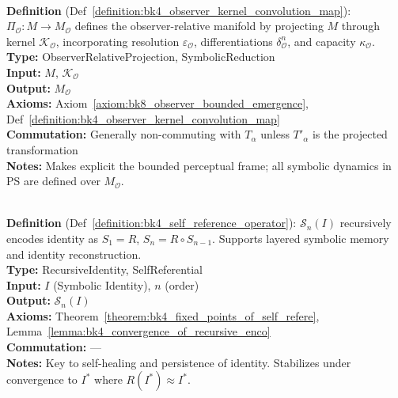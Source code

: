 \begin{description}[leftmargin=2.5cm, style=nextline]
\item[\textbf{Observer Kernel Projection} \hfill \ensuremath{\Pi_{\mathcal{O}}}] \leavevmode\\
\textbf{Definition} (Def~\ref{definition:bk4_observer_kernel_convolution_map}): \( \Pi_{\mathcal{O}} : M \rightarrow M_{\mathcal{O}} \) defines the observer-relative manifold by projecting \( M \) through kernel \( \mathcal{K}_{\mathcal{O}} \), incorporating resolution \( \varepsilon_{\mathcal{O}} \), differentiations \( \delta^n_{\mathcal{O}} \), and capacity \( \kappa_{\mathcal{O}} \).\\
\textbf{Type:} ObserverRelativeProjection, SymbolicReduction\\
\textbf{Input:} \( M \), \( \mathcal{K}_{\mathcal{O}} \)\\
\textbf{Output:} \( M_{\mathcal{O}} \)\\
\textbf{Axioms:} Axiom~\ref{axiom:bk8_observer_bounded_emergence}, Def~\ref{definition:bk4_observer_kernel_convolution_map}\\
\textbf{Commutation:} Generally non-commuting with \( T_\alpha \) unless \( T'_\alpha \) is the projected transformation\\
\textbf{Notes:} Makes explicit the bounded perceptual frame; all symbolic dynamics in PS are defined over \( M_{\mathcal{O}} \).

\item[\textbf{Self-Reference Operator} \hfill \ensuremath{\mathcal{S}_n}] \leavevmode\\
\textbf{Definition} (Def~\ref{definition:bk4_self_reference_operator}): \( \mathcal{S}_n(I) \) recursively encodes identity as \( S_1 = R \), \( S_n = R \circ S_{n-1} \). Supports layered symbolic memory and identity reconstruction.\\
\textbf{Type:} RecursiveIdentity, SelfReferential\\
\textbf{Input:} \( I \) (Symbolic Identity), \( n \) (order)\\
\textbf{Output:} \( \mathcal{S}_n(I) \)\\
\textbf{Axioms:} Theorem~\ref{theorem:bk4_fixed_points_of_self_refere}, Lemma~\ref{lemma:bk4_convergence_of_recursive_enco}\\
\textbf{Commutation:} ---\\
\textbf{Notes:} Key to self-healing and persistence of identity. Stabilizes under convergence to \( I^* \) where \( R(I^*) \approx I^* \).


\end{description}
